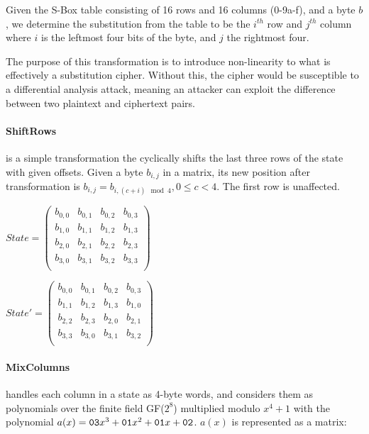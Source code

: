     Given the S-Box table consisting of 16 rows and 16 columns (0-9a-f), and a byte $b$, we determine the substitution from the table to be the $i^{th}$ row and $j^{th}$ column where $i$ is the leftmost four bits of the byte, and $j$ the rightmost four.
    
    The purpose of this transformation is to introduce non-linearity to what is effectively a substitution cipher. Without this, the cipher would be susceptible to a differential analysis attack, meaning an attacker can exploit the difference between two plaintext and ciphertext pairs.
    
    \paragraph{ShiftRows} is a simple transformation the cyclically shifts the last three rows of the state with given offsets. Given a byte $b_{i,j}$ in a matrix, its new position after transformation is $b_{i,j} = b_{i,(c+i) \mod 4}, 0 \leq c < 4$. The first row is unaffected.
    
    \begin{center}
    $State = \begin{pmatrix}
      b_{0,0} & b_{0,1} & b_{0,2} & b_{0,3} \\
      b_{1,0} & b_{1,1} & b_{1,2} & b_{1,3} \\
      b_{2,0} & b_{2,1} & b_{2,2} & b_{2,3} \\
      b_{3,0} & b_{3,1} & b_{3,2} & b_{3,3} \\
    \end{pmatrix}$
    
    $State' = \begin{pmatrix}
      b_{0,0} & b_{0,1} & b_{0,2} & b_{0,3} \\
      b_{1,1} & b_{1,2} & b_{1,3} & b_{1,0} \\
      b_{2,2} & b_{2,3} & b_{2,0} & b_{2,1} \\
      b_{3,3} & b_{3,0} & b_{3,1} & b_{3,2} \\
    \end{pmatrix}$
    \end{center}
    
    \paragraph{MixColumns}
    
    handles each column in a state as 4-byte words, and considers them as polynomials over the finite field GF($2^8$) multiplied modulo $x^4 + 1$ with the polynomial $a(x) = \verb!03!x^3 + \verb!01!x^2 + \verb!01!x + \verb!02!$. $a(x)$ is represented as a matrix:
    
